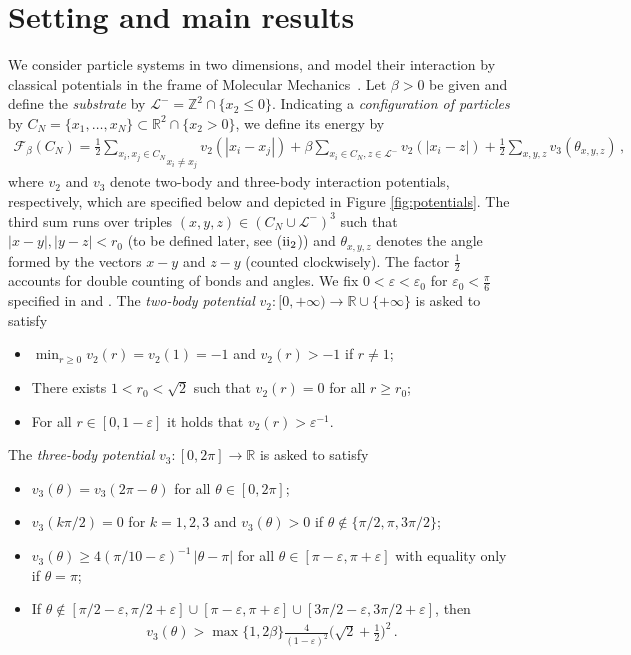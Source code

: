 \documentclass[reqno]{amsart}
\newcommand{\eps}{\varepsilon}
\theoremstyle{plain}
\theoremstyle{definition}
\numberwithin{equation}{section}
\begin{document}
\section{Setting and main results}\label{sec:setting}


We consider particle systems in two dimensions, and model their
interaction by classical potentials in the frame of Molecular
Mechanics~\cite{Molecular, Lewars}. Let $\beta >0$ be given and define the \emph{substrate} by $\mathcal{L}^-=\mathbb{Z}^2 \cap \{x_2 \leq 0\}$. Indicating  a   \emph{configuration of particles} by $C_N =\{x_1,\ldots,x_N\} \subset \mathbb{R}^2\cap \{x_2 >0\}$, we define its energy by
\begin{align}\label{eq: main energy}
\mathcal{F}_\beta(C_N) = \frac{1}{2}\underset{x_i \neq x_j}{\sum_{x_i,x_j \in C_N}} v_2(|x_i-x_j|) + 
\beta \sum_{x_i \in C_N,  z \in \mathcal{L}^-} v_2(|x_i-z|) + \frac{1}{2} \sum_{x,y,z } v_3(\theta_{x,y,z})\,,
\end{align}
where $v_2$ and $v_3$ denote two-body and three-body interaction
potentials, respectively, which are specified below and depicted in
Figure \ref{fig:potentials}.  The third sum runs over triples
$(x,y,z)\in ( C_N \cup \mathcal{L}^-)^3$ such that $|x-y|,|y-z|<r_0$
(to be defined later, see ($\rm ii_2$)) and $\theta_{x,y,z}$ denotes
the angle formed by the vectors $x-y$ and $z-y$ (counted clockwisely).
The factor $\frac{1}{2}$ accounts for double counting of bonds and
angles. We fix  $0<\varepsilon<\varepsilon_0$ for $\varepsilon_0 <
\frac{\pi}{6}$ specified in  and
.  The \emph{two-body potential} $v_2 \colon
[0,+\infty) \to {\mathbb{R}}  \cup \lbrace + \infty \rbrace $  is
asked to satisfy  
\begin{itemize}
\item[($\rm i_2$)] $\min_{r \geq 0} v_2(r) = v_2(1)=-1$ and $v_2(r) >-1$ if $r \neq 1$;
\item[($\rm ii_2$)] There exists $1<r_0<\sqrt{2}$ such that $v_2(r)=0$ for all $r \geq r_0$;
\item[($\rm iii_2$)] For all $r \in [0,1-\varepsilon] $  it holds that   $v_2(r) > \varepsilon^{-1}$.
\end{itemize}
The \emph{three-body potential} $v_3 \colon [0,2\pi] \to \mathbb{R}$
 is asked to satisfy 
\begin{itemize}
\item[($\rm i_3$)] $v_3(\theta)=v_3(2\pi-\theta)$ for all $\theta \in [0,2\pi]$;
\item[($\rm ii_3$)] $v_3(k\pi/2)=0$ for $k=1,2,3$ and $v_3(\theta) >0$ if $\theta \notin \{\pi/2,\pi,3\pi/2\}$;
\item[($\rm iii_3$)] $v_3(\theta)  \geq   4(\pi/10 -\varepsilon)^{-1} \, |\theta -\pi |$ for all $\theta \in [\pi- \eps,\pi + \eps]$     with equality only if $\theta = \pi$;  
\item[($\rm iv_3$)] If $\theta \notin [\pi/2-\varepsilon,\pi/2+\varepsilon] \cup [\pi-\varepsilon,\pi+\varepsilon] \cup [3\pi/2-\varepsilon,3\pi/2+\varepsilon]$, then 
\begin{align*}
 v_3(\theta) >  \max\{1, 2  \beta\}  \frac{4}{(1-\varepsilon)^2}\Big(\sqrt{2} +\frac{1}{2}\Big)^2\,.
\end{align*} 
\end{itemize}
\end{document}
